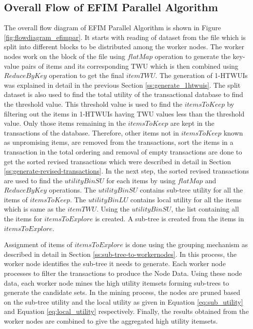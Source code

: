 \documentclass[11pt,openright]{report}
\begin{document}
\subsection{Overall Flow of EFIM Parallel Algorithm}
The overall flow diagram of EFIM Parallel Algorithm is shown in Figure \ref{fig:flowdiagram_efimpar}. It starts with reading of dataset from the file which is split into different blocks to be distributed among the worker nodes. The worker nodes work on the block of the file using $flatMap$ operation to generate the key-value pairs of items and its corresponding TWU which is then combined using $ReduceByKey$ operation to get the final $itemTWU$. The generation of 1-HTWUIs was explained in detail in the previous Section \ref{ss:generate_1htwuis}. The split dataset is also used to find the total utility of the transactional database to find the threshold value. This threshold value is used to find the $itemsToKeep$ by filtering out the items in 1-HTWUIs having TWU values less than the threshold value. Only those items remaining in the $itemsToKeep$ are kept in the transactions of the database. Therefore, other items not in $itemsToKeep$ known as unpromising items, are removed from the transactions, sort the items in a transaction in the total ordering and removal of empty transactions are done to get the sorted revised transactions which were described in detail in Section \ref{ss:generate-revised-transactions}. In the next step, the sorted revised transactions are used to find the $utilityBinSU$ for each items by using $flatMap$ and $ReduceByKey$ operations. The $utilityBinSU$ contains sub-tree utility for all the items of $itemsToKeep$. The $utilityBinLU$ contains local utility for all the items which is same as the $itemTWU$. Using the $utilityBinSU$, the list containing all the items for $itemsToExplore$ is created. A sub-tree is created from the items in $itemsToExplore$.

Assignment of items of $itemsToExplore$ is done using the grouping mechanism as described in detail in Section \ref{ss:sub-tree-to-workernodes}. In this process, the worker node identifies the sub-tree it needs to generate. Each worker node processes to filter the transactions to produce the Node Data. Using these node data, each worker node mines the high utility itemsets forming sub-trees to generate the candidate sets. In the mining process, the nodes are pruned based on the sub-tree utility and the local utility as given in Equation \ref{eq:sub_utility} and Equation \ref{eq:local_utility} respectively. Finally, the results obtained from the worker nodes are combined to give the aggregated high utility itemsets.
\end{document}
